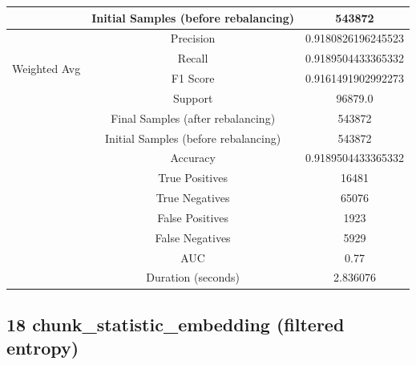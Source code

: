 \begin{longtable}{|c|c|c|}
 & Initial Samples (before rebalancing) & 543872 \\
\hline
\multirow{4}{*}{Weighted Avg} & Precision & 0.9180826196245523 \\
 & Recall & 0.9189504433365332 \\
 & F1 Score & 0.9161491902992273 \\
 & Support & 96879.0 \\
 & Final Samples (after rebalancing) & 543872 \\
 & Initial Samples (before rebalancing) & 543872 \\
\hline
& Accuracy & 0.9189504433365332 \\ \hline
& True Positives & 16481 \\ \hline
& True Negatives & 65076 \\ \hline
& False Positives & 1923 \\ \hline
& False Negatives & 5929 \\ \hline
& AUC & 0.77 \\ \hline
& Duration (seconds) & 2.836076 \\ \hline
\end{longtable}

\subsection{18 chunk\_statistic\_embedding (filtered entropy)}

